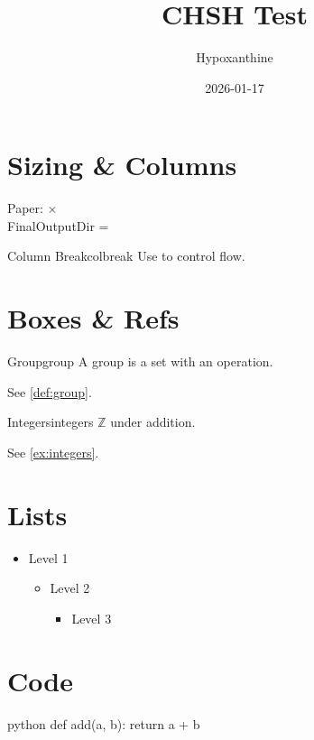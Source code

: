 \documentclass[
  outputdir=build,
  colorscheme=Tech,
  columns=3,
  colsep=10pt,
  paperarea=a4,
  areascale=2,
  paperaspect=0.7070707071,
  chapterbreak=column
]{Hypo-CHSH}
\title{CHSH Test}
\author{Hypoxanthine}
\date{2026-01-17}
\begin{document}
\maketitle

\section{Sizing \& Columns}
Paper: \texttt{\the\paperwidth} $\times$ \texttt{\the\paperheight}\\
FinalOutputDir = \texttt{\FinalOutputDir}

\begin{note}{Column Break}{colbreak}
Use \texttt{\string\CHSHColumnBreak} to control flow.
\end{note}

\CHSHColumnBreak

\section{Boxes \& Refs}
\begin{definition}{Group}{group}
A group is a set with an operation.
\end{definition}
See \cref{def:group}.

\begin{example}{Integers}{integers}
$\mathbb{Z}$ under addition.
\end{example}
See \cref{ex:integers}.

\section{Lists}
\begin{itemize}
  \item Level 1
  \begin{itemize}
    \item Level 2
    \begin{itemize}
      \item Level 3
    \end{itemize}
  \end{itemize}
\end{itemize}

\section{Code}
\begin{hypocode}{python}
def add(a, b):
  return a + b
\end{hypocode}
\end{document}
